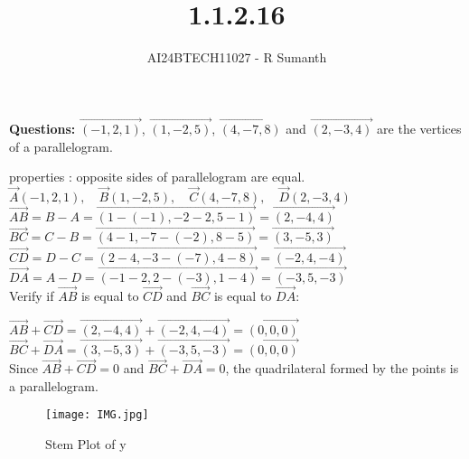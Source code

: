 \documentclass[journal]{IEEEtran}
\begin{document}

\vspace{3cm}

\title{1.1.2.16}
\author{AI24BTECH11027 - R Sumanth}
{\let\newpage\relax\maketitle}

\renewcommand{\thefigure}{\theenumi}
\renewcommand{\thetable}{\theenumi}
\setlength{\intextsep}{10pt} %



\textbf{Questions:} $\vec{(-1,2,1)}$, $\vec{(1,-2,5)}$, $\vec{(4,-7,8)}$ and $\vec{(2,-3,4)}$ are the vertices of a parallelogram.

\solution

properties : opposite sides of parallelogram are equal.\\

$\Vec{A}(-1, 2, 1), \quad \vec{B}(1, -2, 5), \quad \vec{C}(4, -7, 8), \quad \vec{D}(2, -3, 4)$ \\


$\overrightarrow{AB}= B - A =\vec{(1 - (-1), -2 - 2, 5 - 1)} =\vec{(2, -4, 4)}$ \\

$\overrightarrow{BC} = C - B = \vec{(4 - 1, -7 - (-2), 8 - 5)} =\vec{(3, -5, 3)}$ \\

$\overrightarrow{CD} = D - C =\vec{(2 - 4, -3 - (-7), 4 - 8)} = \vec{(-2, 4, -4)}$ \\

$\overrightarrow{DA} = A - D = \vec{(-1 - 2, 2 - (-3), 1 - 4)} = \vec{(-3, 5, -3)}$ \\

Verify if $\overrightarrow{AB}$ is equal to $ \overrightarrow{CD} $ and $ \overrightarrow{BC} $ is equal to $ \overrightarrow{DA} $:

$\overrightarrow{AB} + \overrightarrow{CD} = \vec{(2, -4, 4)} + \vec{(-2, 4, -4)} = \vec{(0, 0, 0)}$ \\

$\overrightarrow{BC} + \overrightarrow{DA} = \vec{(3, -5, 3)} + \vec{(-3, 5, -3)} = \vec{(0, 0, 0)}$ \\

Since $\overrightarrow{AB} + \overrightarrow{CD} = 0 $ and $ \overrightarrow{BC} + \overrightarrow{DA} = 0 $, the quadrilateral formed by the points is a parallelogram.

\begin{figure}[h!]
   \centering
   \texttt{[image: IMG.jpg]}
   \caption{Stem Plot of y}
     \label{stemplot}
\end{figure}

\renewcommand{\thetable}{\theenumi}
\end{document}
